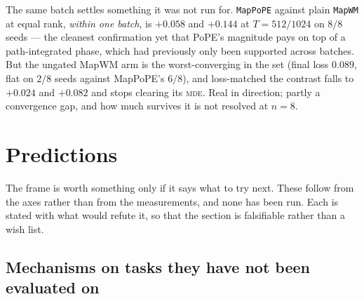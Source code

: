 \documentclass[11pt]{article}
\begin{document}
The same batch settles something it was not run for. \texttt{MapPoPE} against plain
\texttt{MapWM} at equal rank, \emph{within one batch}, is $+0.058$ and $+0.144$ at
$T=512/1024$ on $8/8$ seeds --- the cleanest confirmation yet that PoPE's magnitude
pays on top of a path-integrated phase, which had previously only been supported
across batches. But the ungated MapWM arm is the worst-converging in the set (final
loss $0.089$, flat on $2/8$ seeds against MapPoPE's $6/8$), and loss-matched the
contrast falls to $+0.024$ and $+0.082$ and stops clearing its \textsc{mde}. Real in
direction; partly a convergence gap, and how much survives it is not resolved at
$n=8$.


\section{Predictions}
\label{sec:predictions}

The frame is worth something only if it says what to try next. These follow from
the axes rather than from the measurements, and none has been run. Each is stated
with what would refute it, so that the section is falsifiable rather than a wish
list.

\subsection{Mechanisms on tasks they have not been evaluated on}
\end{document}
